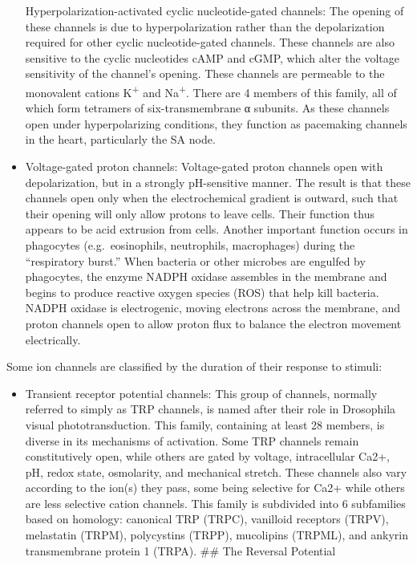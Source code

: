 \documentclass[]{book}
\providecommand{\tightlist}{%
  \setlength{\itemsep}{0pt}\setlength{\parskip}{0pt}}
\begin{document}
\begin{itemize}
  Hyperpolarization-activated cyclic nucleotide-gated channels: The opening of these channels is due to hyperpolarization rather than the depolarization required for other cyclic nucleotide-gated channels. These channels are also sensitive to the cyclic nucleotides cAMP and cGMP, which alter the voltage sensitivity of the channel's opening. These channels are permeable to the monovalent cations K\textsuperscript{+} and Na\textsuperscript{+}. There are 4 members of this family, all of which form tetramers of six-transmembrane α subunits. As these channels open under hyperpolarizing conditions, they function as pacemaking channels in the heart, particularly the SA node.
\item
  Voltage-gated proton channels: Voltage-gated proton channels open with depolarization, but in a strongly pH-sensitive manner. The result is that these channels open only when the electrochemical gradient is outward, such that their opening will only allow protons to leave cells. Their function thus appears to be acid extrusion from cells. Another important function occurs in phagocytes (e.g.~eosinophils, neutrophils, macrophages) during the ``respiratory burst.'' When bacteria or other microbes are engulfed by phagocytes, the enzyme NADPH oxidase assembles in the membrane and begins to produce reactive oxygen species (ROS) that help kill bacteria. NADPH oxidase is electrogenic, moving electrons across the membrane, and proton channels open to allow proton flux to balance the electron movement electrically.
\end{itemize}

Some ion channels are classified by the duration of their response to stimuli:

\begin{itemize}
\tightlist
\item
  Transient receptor potential channels: This group of channels, normally referred to simply as TRP channels, is named after their role in Drosophila visual phototransduction. This family, containing at least 28 members, is diverse in its mechanisms of activation. Some TRP channels remain constitutively open, while others are gated by voltage, intracellular Ca2+, pH, redox state, osmolarity, and mechanical stretch. These channels also vary according to the ion(s) they pass, some being selective for Ca2+ while others are less selective cation channels. This family is subdivided into 6 subfamilies based on homology: canonical TRP (TRPC), vanilloid receptors (TRPV), melastatin (TRPM), polycystins (TRPP), mucolipins (TRPML), and ankyrin transmembrane protein 1 (TRPA).
  \#\# The Reversal Potential
\end{itemize}
\end{document}
